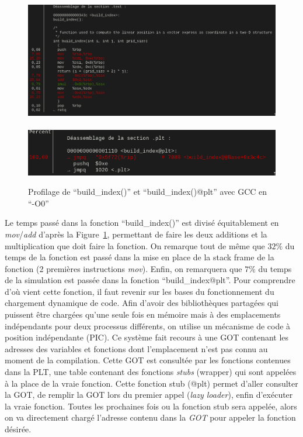 \documentclass[12pt,a4paper]{article}
\begin{document}
\begin{figure}[h]
    \centering
    \includegraphics[scale=0.40]{figures/optims/gcc-O0/build_index.png}
    \\ \phantom{ } \\
    \includegraphics[scale=0.55]{figures/optims/gcc-O0/build_index@plt.png}
    \caption{Profilage de \enquote{build\_index()} et \enquote{build\_index()@plt} avec \ac{GCC} en \enquote{-O0}}
    \label{fig.optim.build_index}
\end{figure}

Le temps passé dans la fonction \enquote{build\_index()} est divisé
équitablement en \textit{mov}/\textit{add} d'après la
Figure~\ref{fig.optim.build_index}, permettant de faire les deux additions et la
multiplication que doit faire la fonction. On remarque tout de même que $32\%$
du temps de la fonction est passé dans la mise en place de la stack frame de la
fonction (2 premières instructions \textit{mov}). Enfin, on remarquera que $7\%$
du temps de la simulation est passée dans la fonction \enquote{build\_index@plt}.
Pour comprendre d’où vient cette fonction, il faut revenir sur les bases du
fonctionnement du chargement dynamique de code. Afin d’avoir des bibliothèques
partagées qui puissent être chargées qu’une seule fois en mémoire mais à des
emplacements indépendants pour deux processus différents, on utilise un
mécanisme de code à position indépendante (\ac{PIC}). Ce système fait recours à
une \ac{GOT} contenant les adresses des variables et fonctions dont
l’emplacement n’est pas connu au moment de la compilation. Cette \ac{GOT} est
consultée par les fonctions contenues dans la \ac{PLT}, une table contenant des
fonctions \textit{stubs} (wrapper) qui sont appelées à la place de la vraie
fonction. Cette fonction stub (@plt) permet d’aller consulter la \ac{GOT}, de
remplir la \ac{GOT} lors du premier appel (\textit{lazy loader}), enfin
d’exécuter la vraie fonction. Toutes les prochaines fois ou la fonction stub
sera appelée, alors on va directement chargé l’adresse contenu dans la
\textit{GOT} pour appeler la fonction désirée.
\end{document}
